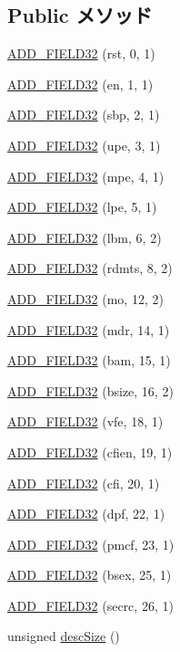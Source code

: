 \subsection*{Public メソッド}
\begin{DoxyCompactItemize}
\item 
\hyperlink{structiGbReg_1_1Regs_1_1RCTL_a0dc106893a41122c327230f9290f08cb}{ADD\_\-FIELD32} (rst, 0, 1)
\item 
\hyperlink{structiGbReg_1_1Regs_1_1RCTL_a0d3ee24d460c2635ff314d3fefeb246c}{ADD\_\-FIELD32} (en, 1, 1)
\item 
\hyperlink{structiGbReg_1_1Regs_1_1RCTL_a54945f06dbee1d06b7d84d3acfbf418b}{ADD\_\-FIELD32} (sbp, 2, 1)
\item 
\hyperlink{structiGbReg_1_1Regs_1_1RCTL_a315e8cd1a2b5ee1dc2aee223e882cebf}{ADD\_\-FIELD32} (upe, 3, 1)
\item 
\hyperlink{structiGbReg_1_1Regs_1_1RCTL_a6a2d44acebaf7d196cdd2a49e3ea32b2}{ADD\_\-FIELD32} (mpe, 4, 1)
\item 
\hyperlink{structiGbReg_1_1Regs_1_1RCTL_a8416a2b84cad7d548dc684d13819d8e8}{ADD\_\-FIELD32} (lpe, 5, 1)
\item 
\hyperlink{structiGbReg_1_1Regs_1_1RCTL_ae439411dda3f825a52339f8e54d8411b}{ADD\_\-FIELD32} (lbm, 6, 2)
\item 
\hyperlink{structiGbReg_1_1Regs_1_1RCTL_ab48175b3d28dce14388b9d3df1dbdeca}{ADD\_\-FIELD32} (rdmts, 8, 2)
\item 
\hyperlink{structiGbReg_1_1Regs_1_1RCTL_a2d9f35eab47fd35371370381e8168244}{ADD\_\-FIELD32} (mo, 12, 2)
\item 
\hyperlink{structiGbReg_1_1Regs_1_1RCTL_a41757114625b04adf508b5785dfed64c}{ADD\_\-FIELD32} (mdr, 14, 1)
\item 
\hyperlink{structiGbReg_1_1Regs_1_1RCTL_a7ba97ab84e55d8a6996caaf11ead4bc9}{ADD\_\-FIELD32} (bam, 15, 1)
\item 
\hyperlink{structiGbReg_1_1Regs_1_1RCTL_a857d5434d2551f69a7f80be7760363e3}{ADD\_\-FIELD32} (bsize, 16, 2)
\item 
\hyperlink{structiGbReg_1_1Regs_1_1RCTL_a4b2cfb05b89061c989da09dc3c3fb8ee}{ADD\_\-FIELD32} (vfe, 18, 1)
\item 
\hyperlink{structiGbReg_1_1Regs_1_1RCTL_ac8b5afa1e43790df356a43a0af1e3149}{ADD\_\-FIELD32} (cfien, 19, 1)
\item 
\hyperlink{structiGbReg_1_1Regs_1_1RCTL_ae98b2013c4a4e13ab6a30a01855ce08d}{ADD\_\-FIELD32} (cfi, 20, 1)
\item 
\hyperlink{structiGbReg_1_1Regs_1_1RCTL_a35d4d3e4a8981ca34d1eda319b643c61}{ADD\_\-FIELD32} (dpf, 22, 1)
\item 
\hyperlink{structiGbReg_1_1Regs_1_1RCTL_a811d108df6270afd28c19848dd9083cd}{ADD\_\-FIELD32} (pmcf, 23, 1)
\item 
\hyperlink{structiGbReg_1_1Regs_1_1RCTL_a7b746b486b4541a9088462000c7ea276}{ADD\_\-FIELD32} (bsex, 25, 1)
\item 
\hyperlink{structiGbReg_1_1Regs_1_1RCTL_a5aedfe7509a48c3253927d3362b1fe66}{ADD\_\-FIELD32} (secrc, 26, 1)
\item 
unsigned \hyperlink{structiGbReg_1_1Regs_1_1RCTL_a1bbf4e6bcea1cdfef4f7062a31f97e9f}{descSize} ()
\end{DoxyCompactItemize}


